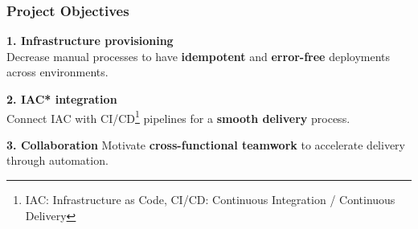 \documentclass{beamer}
\begin{document}
\begin{frame}
\frametitle{Project Objectives}

\begin{tcolorbox}[colframe=cyan!30, colback=white, arc=3mm, boxrule=0.6pt,
  left=2mm, right=2mm, top=1mm, bottom=1mm, width=\textwidth]
  \textbf{1. Infrastructure provisioning} \\
  \vspace{0.4em}
  Decrease manual processes to have \textbf{idempotent} and \textbf{error-free} deployments across environments.
\end{tcolorbox}

\vspace{0.3em}

\begin{tcolorbox}[colframe=cyan!30, colback=white, arc=3mm, boxrule=0.6pt,
  left=2mm, right=2mm, top=1mm, bottom=1mm, width=\textwidth]
  \textbf{2. IAC* integration} \\
  \vspace{0.4em}
  Connect IAC with CI/CD\footnote{IAC: Infrastructure as Code, CI/CD: Continuous Integration / Continuous Delivery} pipelines for a \textbf{smooth delivery} process.
\end{tcolorbox}

\vspace{0.3em}

\begin{tcolorbox}[colframe=cyan!30, colback=white, arc=3mm, boxrule=0.6pt,
  left=2mm, right=2mm, top=1mm, bottom=1mm, width=\textwidth]
  \textbf{3. Collaboration} \vspace{0.4em} Motivate \textbf{ cross-functional teamwork} to accelerate delivery through automation.
\end{tcolorbox}
\end{frame}
\end{document}

